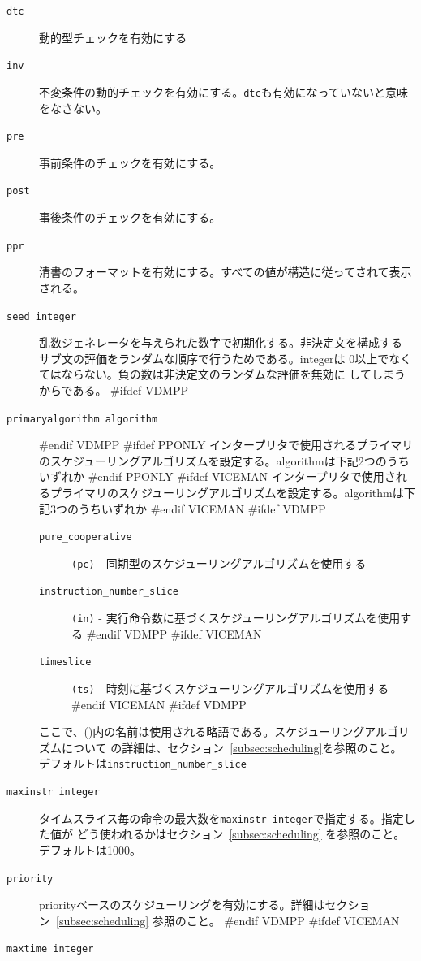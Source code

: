 \documentclass[\pformat,12pt]{article}
\begin{document}
\begin{description}
  \begin{description}
  \item[{\tt dtc}] 動的型チェックを有効にする
  \item[{\tt inv}] 不変条件の動的チェックを有効にする。{\tt dtc}も有効になっていないと意味をなさない。
  \item[{\tt pre}] 事前条件のチェックを有効にする。
  \item[{\tt post}] 事後条件のチェックを有効にする。
  \item[{\tt ppr}] 清書のフォーマットを有効にする。すべての値が構造に従ってされて表示される。
  \item[{\tt seed integer}]
    乱数ジェネレータを与えられた数字で初期化する。非決定文を構成する
    サブ文の評価をランダムな順序で行うためである。integerは
     0以上でなくてはならない。負の数は非決定文のランダムな評価を無効に
    してしまうからである。
#ifdef VDMPP
  \item[{\tt primaryalgorithm algorithm}]
#endif VDMPP
#ifdef PPONLY
    インタープリタで使用されるプライマリのスケジューリングアルゴリズムを設定する。algorithmは下記2つのうちいずれか
#endif PPONLY
#ifdef VICEMAN
    インタープリタで使用されるプライマリのスケジューリングアルゴリズムを設定する。algorithmは下記3つのうちいずれか
#endif VICEMAN
#ifdef VDMPP
    \begin{description}
    \item[{\tt pure\_cooperative}] \texttt{(pc)} - 同期型のスケジューリングアルゴリズムを使用する
    \item[{\tt instruction\_number\_slice}] \texttt{(in)} - 実行命令数に基づくスケジューリングアルゴリズムを使用する
#endif VDMPP
#ifdef VICEMAN
    \item[{\tt timeslice}] \texttt{(ts)} - 時刻に基づくスケジューリングアルゴリズムを使用する
#endif VICEMAN
#ifdef VDMPP
    \end{description}
    ここで、()内の名前は使用される略語である。スケジューリングアルゴリズムについて
    の詳細は、セクション~\ref{subsec:scheduling}を参照のこと。
    デフォルトは{\tt instruction\_number\_slice}
  \item[{\tt maxinstr integer}]
    タイムスライス毎の命令の最大数を{\tt maxinstr integer}で指定する。指定した値が
    どう使われるかはセクション~\ref{subsec:scheduling} を参照のこと。デフォルトは1000。
  \item[{\tt priority}]
    priorityベースのスケジューリングを有効にする。詳細はセクション~\ref{subsec:scheduling} 参照のこと。
#endif VDMPP
#ifdef VICEMAN
  \item[{\tt maxtime integer}]

\end{description}
\end{description}
\end{document}
